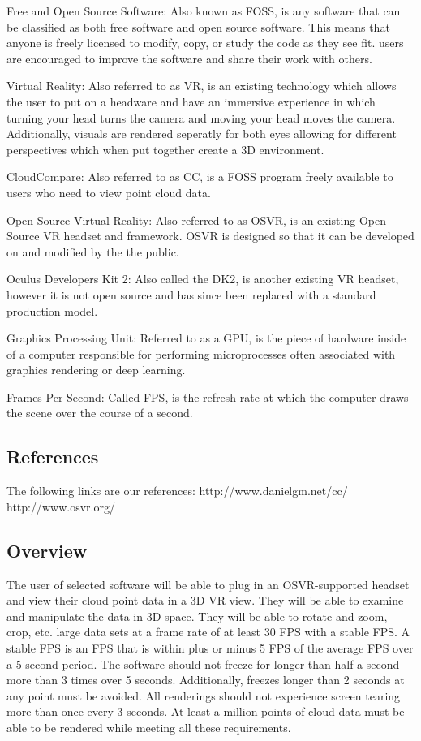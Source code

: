 \documentclass[titlepage]{article}
\begin{document}
Free and Open Source Software: Also known as FOSS, is any software that can be classified as both free software and open source software. This means that anyone is freely licensed to modify, copy, or study the code as they see fit. users are encouraged to improve the software and share their work with others.

Virtual Reality: Also referred to as VR, is an existing technology which allows the user to put on a headware and have an immersive experience in which turning your head turns the camera and moving your head moves the camera.
Additionally, visuals are rendered seperatly for both eyes allowing for different perspectives which when put together create a 3D environment.

CloudCompare: Also referred to as CC, is a FOSS program freely available to users who need to view point cloud data.

Open Source Virtual Reality: Also referred to as OSVR, is an existing Open Source VR headset and framework. OSVR is designed so that it can be developed on and modified by the the public.

Oculus Developers Kit 2: Also called the DK2, is another existing VR headset, however it is not open source and has since been replaced with a standard production model.

Graphics Processing Unit: Referred to as a GPU, is the piece of hardware inside of a computer responsible for performing microprocesses often associated with graphics rendering or deep learning.

Frames Per Second: Called FPS, is the refresh rate at which the computer draws the scene over the course of a second.

\subsection{References}

The following links are our references:
  http://www.danielgm.net/cc/
  http://www.osvr.org/

\subsection{Overview}

The user of selected software will be able to plug in an OSVR-supported headset and view their cloud point data in a 3D VR view.
They will be able to examine and manipulate the data in 3D space. 
They will be able to rotate and zoom, crop, etc. large data sets at a frame rate of at least 30 FPS with a stable FPS.
A stable FPS is an FPS that is within plus or minus 5 FPS of the average FPS over a 5 second period.
The software should not freeze for longer than half a second more than 3 times over 5 seconds.
Additionally, freezes longer than 2 seconds at any point must be avoided.
All renderings should not experience screen tearing more than once every 3 seconds.
At least a  million points of cloud data must be able to be rendered while meeting all these requirements.
\end{document}
